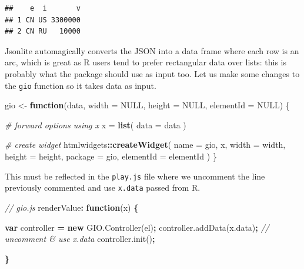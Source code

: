 \documentclass[
]{krantz}
\makeatletter
\newenvironment{Shaded}{\begin{snugshade}}{\end{snugshade}}
\newcommand{\AttributeTok}[1]{\textcolor[rgb]{0.61,0.61,0.61}{#1}}
\newcommand{\CommentTok}[1]{\textcolor[rgb]{0.37,0.37,0.37}{\textit{#1}}}
\newcommand{\ControlFlowTok}[1]{\textcolor[rgb]{0.27,0.27,0.27}{\textbf{#1}}}
\newcommand{\DataTypeTok}[1]{\textcolor[rgb]{0.27,0.27,0.27}{#1}}
\newcommand{\KeywordTok}[1]{\textcolor[rgb]{0.27,0.27,0.27}{\textbf{#1}}}
\newcommand{\NormalTok}[1]{#1}
\newcommand{\OperatorTok}[1]{\textcolor[rgb]{0.43,0.43,0.43}{\textbf{#1}}}
\newcommand{\OtherTok}[1]{\textcolor[rgb]{0.37,0.37,0.37}{#1}}
\newcommand{\StringTok}[1]{\textcolor[rgb]{0.5,0.5,0.5}{#1}}
\newcommand{\VariableTok}[1]{\textcolor[rgb]{0,0,0}{#1}}
\newenvironment{kframe}{%
\medskip{}
\setlength{\fboxsep}{.8em}
 \def\at@end@of@kframe{}%
 \ifinner\ifhmode%
  \def\at@end@of@kframe{\end{minipage}}%
  \begin{minipage}{\columnwidth}%
 \fi\fi%
 \def\FrameCommand##1{\hskip\@totalleftmargin \hskip-\fboxsep
 \colorbox{shadecolor}{##1}\hskip-\fboxsep
     \hskip-\linewidth \hskip-\@totalleftmargin \hskip\columnwidth}%
 \MakeFramed {\advance\hsize-\width
   \@totalleftmargin\z@ \linewidth\hsize
   \@setminipage}}%
 {\par\unskip\endMakeFramed%
 \at@end@of@kframe}
\renewenvironment{Shaded}{\begin{kframe}}{\end{kframe}}
\makeatother
\begin{document}
\begin{verbatim}
##    e  i       v
## 1 CN US 3300000
## 2 CN RU   10000
\end{verbatim}

Jsonlite automagically converts the JSON into a data frame where each row is an arc, which is great as R users tend to prefer rectangular data over lists: this is probably what the package should use as input too. Let us make some changes to the \texttt{gio} function so it takes data as input.

\begin{Shaded}
\begin{Highlighting}[]
\NormalTok{gio <{-}}\StringTok{ }\ControlFlowTok{function}\NormalTok{(data, }\DataTypeTok{width =} \OtherTok{NULL}\NormalTok{, }\DataTypeTok{height =} \OtherTok{NULL}\NormalTok{, }\DataTypeTok{elementId =} \OtherTok{NULL}\NormalTok{) \{}

  \CommentTok{\# forward options using x}
\NormalTok{  x =}\StringTok{ }\KeywordTok{list}\NormalTok{(}
    \DataTypeTok{data =}\NormalTok{ data}
\NormalTok{  )}

  \CommentTok{\# create widget}
\NormalTok{  htmlwidgets}\OperatorTok{::}\KeywordTok{createWidget}\NormalTok{(}
    \DataTypeTok{name =} \StringTok{\textquotesingle{}gio\textquotesingle{}}\NormalTok{,}
\NormalTok{    x,}
    \DataTypeTok{width =}\NormalTok{ width,}
    \DataTypeTok{height =}\NormalTok{ height,}
    \DataTypeTok{package =} \StringTok{\textquotesingle{}gio\textquotesingle{}}\NormalTok{,}
    \DataTypeTok{elementId =}\NormalTok{ elementId}
\NormalTok{  )}
\NormalTok{\}}
\end{Highlighting}
\end{Shaded}

This must be reflected in the \texttt{play.js} file where we uncomment the line previously commented and use \texttt{x.data} passed from R.

\begin{Shaded}
\begin{Highlighting}[]
\CommentTok{// gio.js}
\NormalTok{renderValue}\OperatorTok{:} \KeywordTok{function}\NormalTok{(x) }\OperatorTok{\{}

  \KeywordTok{var}\NormalTok{ controller }\OperatorTok{=} \KeywordTok{new} \VariableTok{GIO}\NormalTok{.}\AttributeTok{Controller}\NormalTok{(el)}\OperatorTok{;}
  \VariableTok{controller}\NormalTok{.}\AttributeTok{addData}\NormalTok{(}\VariableTok{x}\NormalTok{.}\AttributeTok{data}\NormalTok{)}\OperatorTok{;} \CommentTok{// uncomment \& use x.data}
  \VariableTok{controller}\NormalTok{.}\AttributeTok{init}\NormalTok{()}\OperatorTok{;}

\OperatorTok{\}}
\end{Highlighting}
\end{Shaded}
\end{document}

